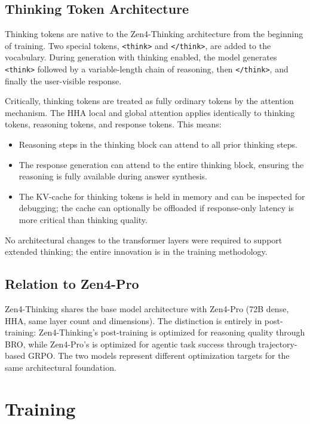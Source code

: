 \documentclass[11pt,a4paper]{article}
\begin{document}
\subsection{Thinking Token Architecture}

Thinking tokens are native to the Zen4-Thinking architecture from the beginning of
training. Two special tokens, \texttt{<think>} and \texttt{</think>}, are added to the
vocabulary. During generation with thinking enabled, the model generates \texttt{<think>}
followed by a variable-length chain of reasoning, then \texttt{</think>}, and finally
the user-visible response.

Critically, thinking tokens are treated as fully ordinary tokens by the attention mechanism.
The HHA local and global attention applies identically to thinking tokens, reasoning tokens,
and response tokens. This means:

\begin{itemize}
    \item Reasoning steps in the thinking block can attend to all prior thinking steps.
    \item The response generation can attend to the entire thinking block, ensuring
    the reasoning is fully available during answer synthesis.
    \item The KV-cache for thinking tokens is held in memory and can be inspected
    for debugging; the cache can optionally be offloaded if response-only latency
    is more critical than thinking quality.
\end{itemize}

No architectural changes to the transformer layers were required to support extended
thinking; the entire innovation is in the training methodology.

\subsection{Relation to Zen4-Pro}

Zen4-Thinking shares the base model architecture with Zen4-Pro (72B dense, HHA, same
layer count and dimensions). The distinction is entirely in post-training:
Zen4-Thinking's post-training is optimized for reasoning quality through BRO,
while Zen4-Pro's is optimized for agentic task success through trajectory-based GRPO.
The two models represent different optimization targets for the same architectural foundation.

\section{Training}
\end{document}
